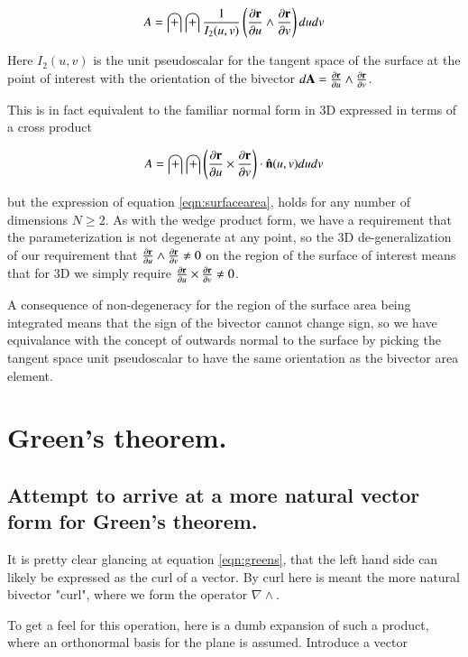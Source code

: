 \documentclass{article}
\newcommand{\grad}[0]{\nabla}
\newcommand{\PD}[2]{\frac{\partial {#2}}{\partial {#1}}}
\begin{document}
\begin{equation}\label{eqn:surfacearea}
A = \int\int \inv{I_2(u,v)} \left(\PD{u}{\Br} \wedge \PD{v}{\Br}\right) du dv
\end{equation}

Here $I_2(u,v)$ is the unit pseudoscalar for the tangent space of the surface at the point of interest with the orientation of the bivector 
$d\BA = \PD{u}{\Br} \wedge \PD{v}{\Br}$.

This is in fact equivalent to the familiar normal form in 3D expressed in terms
of a cross product

\begin{equation}
A = \int\int \left(\PD{u}{\Br} \cross \PD{v}{\Br}\right) \cdot \ncap(u,v) du dv
\end{equation}

but the expression of equation \ref{eqn:surfacearea}, holds for any number of dimensions $N \ge 2$.  As with the wedge product form, we have a requirement that the parameterization is not degenerate at any point, so the 3D de-generalization of our requirement that
$\PD{u}{\Br} \wedge \PD{v}{\Br} \ne 0$
on the region of the surface of interest means that for 3D we simply require
$\PD{u}{\Br} \cross \PD{v}{\Br} \ne 0$.

A consequence of non-degeneracy for the region of the surface area being integrated means that the sign of the bivector cannot change sign, so we have equivalance with the concept of outwards normal to the surface by picking the tangent space unit pseudoscalar to have the same orientation as the bivector area element.

\section{ Green's theorem. }

\subsection{ Attempt to arrive at a more natural vector form for Green's theorem. }

It is pretty clear glancing at equation \ref{eqn:greens}, that the left
hand side can likely be expressed as the curl of a vector.  By curl here
is meant the more natural bivector "curl", where we form the operator $\grad \wedge$.

To get a feel for this operation, here is a dumb expansion of such a product,
where an orthonormal basis for the plane is assumed.  Introduce a vector
\end{document}
